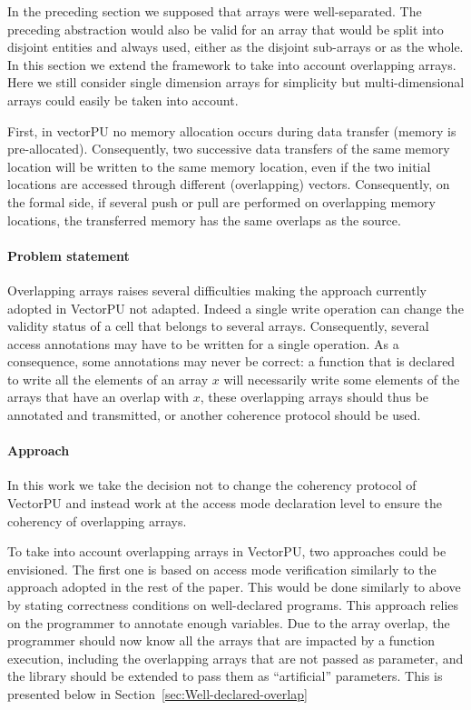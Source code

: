 \documentclass[preprint,12pt]{elsarticle}
\begin{document}
In the preceding section we supposed that arrays were well-separated. The preceding abstraction would also be valid for an array that would be split into disjoint entities and always used, either as the disjoint sub-arrays or as the whole. In this section we extend the framework to take into account overlapping arrays. Here we still consider single dimension arrays for simplicity but multi-dimensional arrays could easily be taken into account.

First, in vectorPU no memory allocation occurs during data transfer (memory is pre-allocated). Consequently, two successive data transfers of the same memory location will be written to the same memory location, even if the two initial locations are accessed through different (overlapping) vectors.
Consequently, on the formal side, if several push or pull are performed on overlapping memory locations, the transferred memory has the same overlaps as the source.

\paragraph{Problem statement}
Overlapping arrays raises several difficulties making the approach currently adopted in VectorPU not adapted. Indeed a single write operation can change the validity status of a cell that belongs to several arrays. Consequently, several access annotations may have to be written for a single operation. As a consequence, some annotations may never be correct: a function that is declared to write all the elements of an array $x$ will necessarily write some elements of the arrays that have an overlap with $x$, these overlapping arrays should thus be annotated and transmitted, or another coherence protocol should be used.

\paragraph{Approach}
In this work we take the decision not to change the coherency protocol of VectorPU and instead work at the access mode declaration level to ensure the coherency of overlapping arrays.

To take into account overlapping arrays in VectorPU, two approaches could be envisioned. The first one is based on access mode verification similarly to the approach adopted in the rest of the paper.  This would be done similarly to above by stating correctness conditions on well-declared programs. This approach relies on the programmer to annotate enough variables. Due to the array overlap, the programmer should now know all the arrays that are impacted by a function execution, including the overlapping arrays that are not passed as parameter, and the library should be extended to pass them as ``artificial'' parameters. This is presented below in Section~\ref{sec:Well-declared-overlap}
\end{document}

